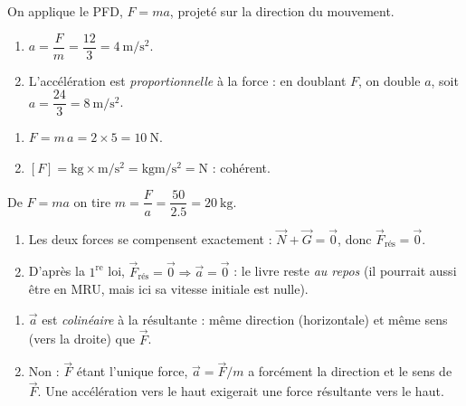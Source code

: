 \documentclass[11pt,a4paper]{article}
\newcommand{\vv}[1]{\vec{#1}}\newcommand{\ds}{\displaystyle}
\begin{document}

\begin{corrige}[deuxième loi : $a=F/m$]
On applique le PFD, $F=ma$, projeté sur la direction du mouvement.
\begin{enumerate}[label=\alph*)]
  \item $a=\dfrac{F}{m}=\dfrac{12}{3}=\qty{4}{\metre\per\second\squared}$.
  \item L'accélération est \emph{proportionnelle} à la force : en doublant $F$, on double $a$, soit
        $a=\dfrac{24}{3}=\qty{8}{\metre\per\second\squared}$.
\end{enumerate}
\end{corrige}

\begin{corrige}[deuxième loi : $F=ma$]
\begin{enumerate}[label=\alph*)]
  \item $F=m\,a=2\times 5=\qty{10}{\newton}$.
  \item $[F]=\si{\kilogram}\times\si{\metre\per\second\squared}=\si{\kilogram\metre\per\second\squared}=\si{\newton}$ : cohérent.
\end{enumerate}
\end{corrige}

\begin{corrige}
De $F=ma$ on tire $m=\dfrac{F}{a}=\dfrac{50}{\num{2,5}}=\qty{20}{\kilogram}$.
\end{corrige}

\begin{corrige}
\begin{enumerate}[label=\alph*)]
  \item Les deux forces se compensent exactement : $\vv N+\vv G=\vv 0$, donc $\vv F_{\text{rés}}=\vv 0$.
  \item D'après la $1^{\text{re}}$ loi, $\vv F_{\text{rés}}=\vv 0 \Rightarrow \vv a=\vv 0$ : le livre reste
        \emph{au repos} (il pourrait aussi être en MRU, mais ici sa vitesse initiale est nulle).
\end{enumerate}
\end{corrige}

\begin{corrige}
\begin{enumerate}[label=\alph*)]
  \item $\vv a$ est \emph{colinéaire} à la résultante : même direction (horizontale) et même sens
        (vers la droite) que $\vv F$.
  \item Non : $\vv F$ étant l'unique force, $\vv a=\vv F/m$ a forcément la direction et le sens de $\vv F$.
        Une accélération vers le haut exigerait une force résultante vers le haut.
\end{enumerate}
\end{corrige}
\end{document}
